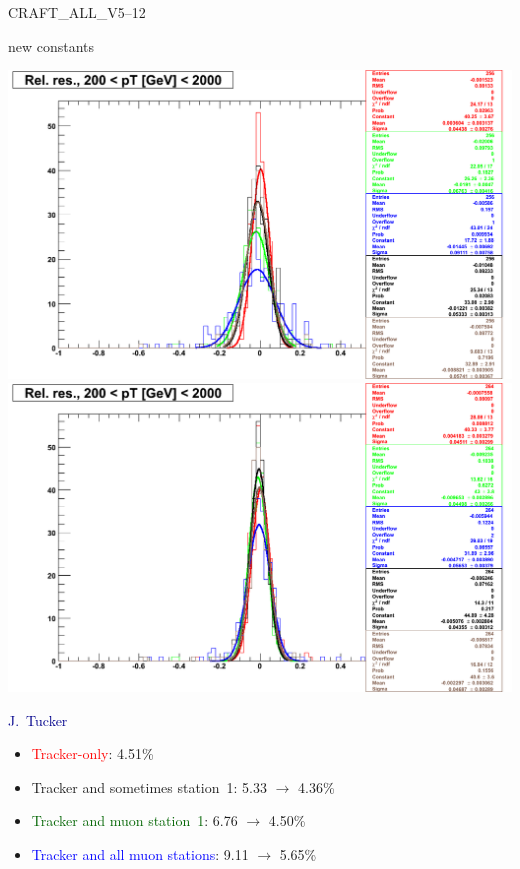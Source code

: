 \documentclass[compress]{beamer}
\begin{document}
\begin{frame}
\begin{itemize}
 station~1,} \mbox{\textcolor{blue}{all stations}\hspace{-1 cm}}
\end{itemize}

\begin{minipage}{0.49\linewidth}\begin{center} \scriptsize CRAFT\_ALL\_V5--12 \end{center}\end{minipage}
\begin{minipage}{0.49\linewidth}\begin{center} \scriptsize new constants \end{center}\end{minipage}

\vspace{0.2 cm}
\includegraphics[width=0.5\linewidth]{R1n-pT2002000_7.png}
\includegraphics[width=0.5\linewidth]{R1n-pT2002000_4.png}

\hfill \textcolor{darkblue}{\scriptsize J.~Tucker}

\vspace{-\baselineskip}
\begin{minipage}{0.8\linewidth}
\begin{itemize}\setlength{\itemsep}{-0.05 cm}
\item \textcolor{red}{Tracker-only}: \hfill 4.51\%
\item Tracker and sometimes station~1: \hfill 5.33 $\to$ 4.36\%
\item \textcolor{darkgreen}{Tracker and muon station~1}: \hfill 6.76 $\to$ 4.50\%
\item \textcolor{blue}{Tracker and all muon stations}: \hfill 9.11 $\to$ 5.65\%
\end{itemize}
\end{minipage}
\end{frame}
\end{document}
